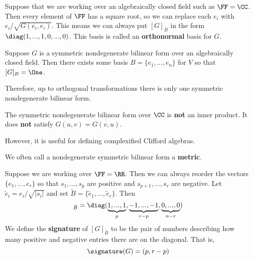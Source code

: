 \begin{defn}
Suppose that we are working over an algebraically closed field such as $\FF=\CC$. Then every element of $\FF$ has a square root, so we can replace each $e_i$ with $e_i/\sqrt{G(e_i,e_i)}$. This means we can always put $[G]_B$ in the form $\diag(1,...,1,0,...,0)$. This basis is called an \textbf{orthonormal} basis for $G$.
\end{defn}

\begin{cor}
    Suppose $G$ is a symmetric nondegenerate bilinear form over an algebraically closed field. Then there exists some basis $B=\{e_1,...,e_n\}$ for $V$ so that $[G]_B = \One$.
\end{cor}
\begin{remark*}
    Therefore, up to orthogonal transformations there is only one symmetric nondegenerate bilinear form.
\end{remark*}
\begin{remark*}
    The symmetric nondegenerate bilinear form over $\CC$ is \textbf{not} an inner product. It does \textbf{not} satisfy $G(u,v) = \overline{G(v,u)}$.

    However, it is useful for defining complexified Clifford algebras.
\end{remark*}
\begin{defn}[Metric] We often call a nondegenerate symmetric bilinear form a \textbf{metric}.     
\end{defn}
\begin{defn}[Signature]
Suppose we are working over $\FF = \RR$. Then we can always reorder the vectors $\{e_1,...,e_r\}$ so that $s_1,...,s_p$ are positive and $s_{p+1},...,s_r$ are negative. Let $\tilde{e}_i = e_i/\sqrt{|s_i|}$ and set $\tilde{B} = \{\tilde{e}_1,...,\tilde{e}_r\}$. Then 
\begin{equation}[G]_{\tilde{B}} = \diag(\underbrace{1,...,1}_{p},\underbrace{-1,...,-1}_{r-p},\underbrace{0,...,0}_{n-r})\end{equation}
We define the \textbf{signature} of $[G]_{\tilde{B}}$ to be the pair of numbers describing how many positive and negative entries there are on the diagonal. That is,
\begin{equation}\signature(G)=(p,r-p)\end{equation}
\end{defn}

